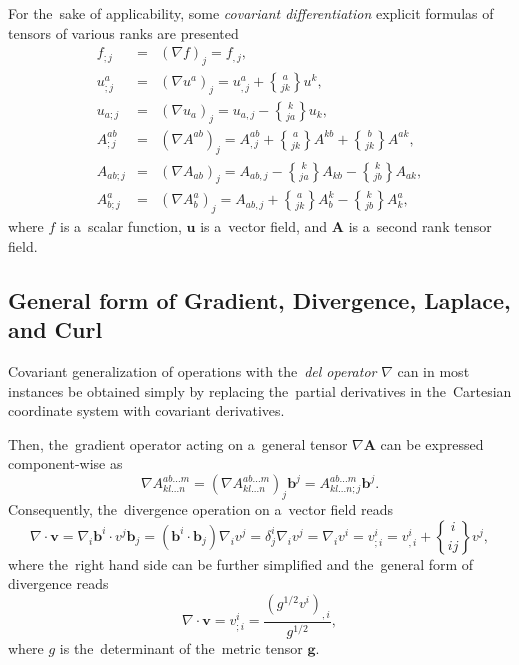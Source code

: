 \documentclass[review]{elsarticle}
\newcommand{\vect}[1]{\boldsymbol{#1}}
\newcommand{\matr}[1]{\mathbf{#1}}
\newcommand{\christ}[3]{\genfrac{\{}{\}}{0pt}{}{#1}{#2 #3}}
\begin{document}
For the~sake of applicability, some \textit{covariant differentiation}
explicit formulas of tensors of various ranks are presented
\begin{eqnarray}
  f_{;j} &=& (\nabla f)_j = f_{,j} , \label{eq:cd_scalar}\\
  u^a_{;j} &=& (\nabla u^a)_j = u^a_{,j} + \christ{a}{j}{k} u^k , 
  \label{eq:cd_contravector} \\
  u_{a;j} &=& (\nabla u_a)_j = u_{a,j} - \christ{k}{j}{a} u_k , 
  \label{eq:cd_covector} \\
  A^{ab}_{;j} &=& (\nabla A^{ab})_j = A^{ab}_{,j} + \christ{a}{j}{k} A^{kb} 
  + \christ{b}{j}{k} A^{ak} , 
  \label{eq:cd_contratensor} \\
  A_{ab;j} &=& (\nabla A_{ab})_j = A_{ab,j} - \christ{k}{j}{a} A_{kb} 
  - \christ{k}{j}{b} A_{ak} ,
  \label{eq:cd_cotensor} \\
  A^a_{b;j} &=& (\nabla A^a_{b})_j = A_{ab,j} + \christ{a}{j}{k} A^k_b
  - \christ{k}{j}{b} A^a_k ,
  \label{eq:cd_mixedtensor}
\end{eqnarray} 
where $f$ is a~scalar function, $\vect{u}$ is a~vector field, and
$\matr{A}$ is a~second rank tensor field.

\subsection{General form of Gradient, Divergence, Laplace, and Curl}
Covariant generalization of operations with the~\textit{del operator} $\nabla$
can in most instances be obtained simply by replacing the~partial derivatives
in the~Cartesian coordinate system with covariant derivatives.

Then, the~gradient operator acting on a~general tensor $\nabla \matr{A}$ can
be expressed component-wise as
\begin{equation}
  \nabla A^{ab...m}_{kl...n} = (\nabla A^{ab...m}_{kl...n})_j\vect{b}^j 
  = A^{ab...m}_{kl...n;j}\vect{b}^j .
  \label{eq:general_grad}
\end{equation}
Consequently, the~divergence operation on a~vector field reads
\begin{equation}
  \nabla\cdot\vect{v} = \nabla_i\vect{b}^i\cdot v^j\vect{b}_j 
  = (\vect{b}^i\cdot\vect{b}_j) \nabla_i v^j = \delta^i_j \nabla_i v^j
  = \nabla_i v^i = v^i_{;i} = v^i_{,i} + \christ{i}{i}{j}v^j ,
  \nonumber
\end{equation}
where the~right hand side can be further simplified and the~general form
of divergence reads
\begin{equation}
  \nabla\cdot\vect{v} = v^i_{;i} = \frac{(g^{1/2}v^i)_{,i}}{g^{1/2}} ,
  \label{eq:general_divvec}
\end{equation}
where $g$ is the~determinant of the~metric tensor $\matr{g}$.
\end{document}
